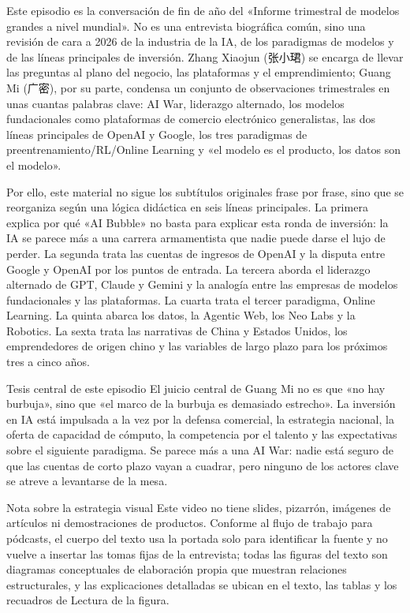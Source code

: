 \documentclass[a4paper]{article}
\begin{document}
Este episodio es la conversación de fin de año del «Informe trimestral de modelos grandes a nivel mundial». No es una entrevista biográfica común, sino una revisión de cara a 2026 de la industria de la IA, de los paradigmas de modelos y de las líneas principales de inversión. Zhang Xiaojun (张小珺) se encarga de llevar las preguntas al plano del negocio, las plataformas y el emprendimiento; Guang Mi (广密), por su parte, condensa un conjunto de observaciones trimestrales en unas cuantas palabras clave: AI War, liderazgo alternado, los modelos fundacionales como plataformas de comercio electrónico generalistas, las dos líneas principales de OpenAI y Google, los tres paradigmas de preentrenamiento/RL/Online Learning y «el modelo es el producto, los datos son el modelo».

Por ello, este material no sigue los subtítulos originales frase por frase, sino que se reorganiza según una lógica didáctica en seis líneas principales. La primera explica por qué «AI Bubble» no basta para explicar esta ronda de inversión: la IA se parece más a una carrera armamentista que nadie puede darse el lujo de perder. La segunda trata las cuentas de ingresos de OpenAI y la disputa entre Google y OpenAI por los puntos de entrada. La tercera aborda el liderazgo alternado de GPT, Claude y Gemini y la analogía entre las empresas de modelos fundacionales y las plataformas. La cuarta trata el tercer paradigma, Online Learning. La quinta abarca los datos, la Agentic Web, los Neo Labs y la Robotics. La sexta trata las narrativas de China y Estados Unidos, los emprendedores de origen chino y las variables de largo plazo para los próximos tres a cinco años.

\begin{importantbox}{Tesis central de este episodio}
El juicio central de Guang Mi no es que «no hay burbuja», sino que «el marco de la burbuja es demasiado estrecho». La inversión en IA está impulsada a la vez por la defensa comercial, la estrategia nacional, la oferta de capacidad de cómputo, la competencia por el talento y las expectativas sobre el siguiente paradigma. Se parece más a una AI War: nadie está seguro de que las cuentas de corto plazo vayan a cuadrar, pero ninguno de los actores clave se atreve a levantarse de la mesa.
\end{importantbox}

\begin{knowledgebox}{Nota sobre la estrategia visual}
Este video no tiene slides, pizarrón, imágenes de artículos ni demostraciones de productos. Conforme al flujo de trabajo para pódcasts, el cuerpo del texto usa la portada solo para identificar la fuente y no vuelve a insertar las tomas fijas de la entrevista; todas las figuras del texto son diagramas conceptuales de elaboración propia que muestran relaciones estructurales, y las explicaciones detalladas se ubican en el texto, las tablas y los recuadros de Lectura de la figura.
\end{knowledgebox}
\end{document}
